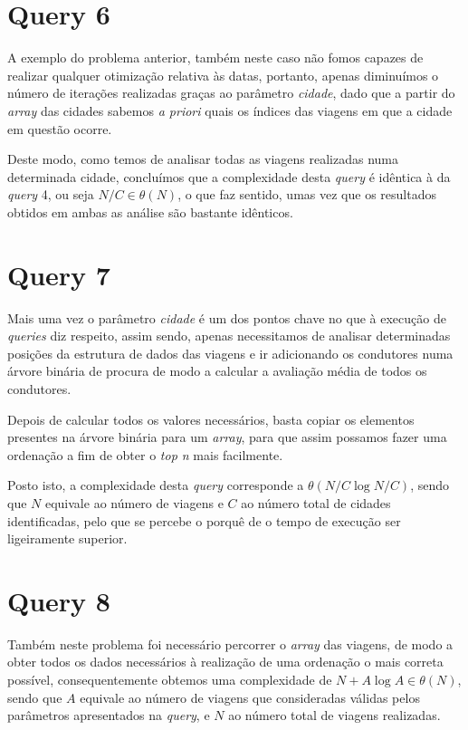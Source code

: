 \documentclass[12pt,a4paper]{report}
\begin{document}
\section{Query 6}

A exemplo do problema anterior, também neste caso não fomos capazes de realizar qualquer otimização relativa às datas, portanto, apenas diminuímos o número de iterações realizadas graças ao parâmetro \textit{cidade}, dado que a partir do \textit{array} das cidades sabemos \textit{a priori} quais os índices das viagens em que a cidade em questão ocorre. 

Deste modo, como temos de analisar todas as viagens realizadas numa determinada cidade, concluímos que a complexidade desta \textit{query} é idêntica à da \textit{query} 4, ou seja \(N/C \in \theta(N)\), o que faz sentido, umas vez que os resultados obtidos em ambas as análise são bastante idênticos.

\section{Query 7}

Mais uma vez o parâmetro \textit{cidade} é um dos pontos chave no que à execução de \textit{queries} diz respeito, assim sendo, apenas necessitamos de analisar determinadas posições da estrutura de dados das viagens e ir adicionando os condutores numa árvore binária de procura de modo a calcular a avaliação média de todos os condutores.

Depois de calcular todos os valores necessários, basta copiar os elementos presentes na árvore binária para um \textit{array}, para que assim possamos fazer uma ordenação a fim de obter o \textit{top n} mais facilmente.

Posto isto, a complexidade desta \textit{query} corresponde a \(\theta(N/C\log N/C)\), sendo que \(N\) equivale ao número de viagens e \(C\) ao número total de cidades identificadas, pelo que se percebe o porquê de o tempo de execução ser ligeiramente superior.

\section{Query 8}

Também neste problema foi necessário percorrer o \textit{array} das viagens, de modo a obter todos os dados necessários à realização de uma ordenação o mais correta possível, consequentemente obtemos uma complexidade de \(N + A\log A \in \theta(N)\), sendo que \(A\) equivale ao número de viagens que consideradas válidas pelos parâmetros apresentados na \textit{query}, e \(N\) ao número total de viagens realizadas.
\end{document}

